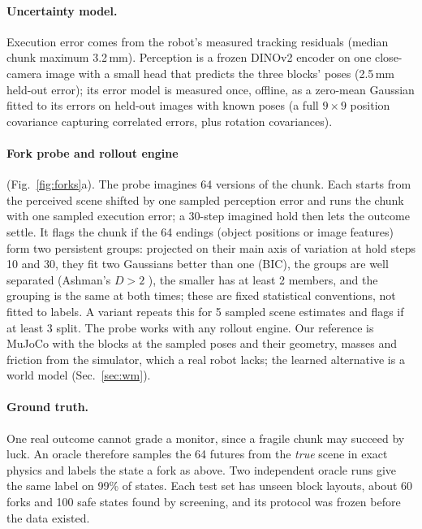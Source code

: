 \documentclass{article}
\begin{document}
\paragraph{Uncertainty model.} Execution error comes from the robot's measured tracking residuals
(median chunk maximum 3.2\,mm). Perception is a frozen DINOv2 encoder \citep{oquab2024dinov2} on one
close-camera image with a small head that predicts the three blocks' poses (2.5\,mm held-out error); its error
model is measured once, offline, as a zero-mean Gaussian fitted to its errors on held-out images with
known poses (a full $9\times9$ position covariance capturing correlated errors, plus rotation covariances).

\paragraph{Fork probe and rollout engine} (Fig.~\ref{fig:forks}a). The probe imagines 64 versions of the
chunk. Each starts from the perceived scene shifted by one sampled perception error and runs the chunk
with one sampled execution error; a 30-step imagined hold then lets the outcome settle. It flags
the chunk if the 64 endings (object positions or image features) form two persistent groups: projected on
their main axis of variation at hold steps 10 and 30, they fit two Gaussians better than one (BIC), the
groups are well separated (Ashman's $D>2$ \citep{ashman1994detecting}), the smaller has at least 2
members, and the grouping is the same at both times; these are fixed statistical conventions, not fitted
to labels. A variant repeats this for 5 sampled scene estimates and flags if at least 3 split. The probe works with any rollout engine. Our reference is MuJoCo with the
blocks at the sampled poses and their geometry, masses and friction from the simulator, which a real robot
lacks; the learned alternative is a world model (Sec.~\ref{sec:wm}).

\paragraph{Ground truth.} One real outcome cannot grade a monitor, since a fragile chunk may succeed by
luck. An oracle therefore samples the 64 futures from the \emph{true} scene in exact physics and labels
the state a fork as above. Two independent oracle runs give the same label on 99\% of states. Each test set has unseen block layouts, about 60 forks and 100 safe states
found by screening, and its protocol was frozen before the data existed.
\end{document}
